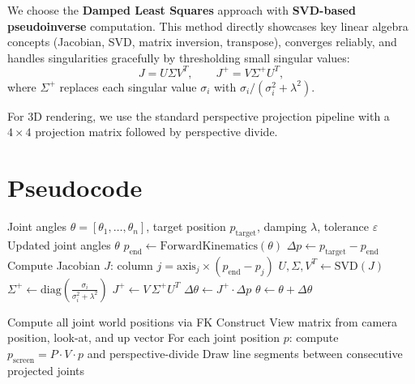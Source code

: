 \documentclass[11pt]{article}
\begin{document}
We choose the \textbf{Damped Least Squares} approach with \textbf{SVD-based pseudoinverse} computation. This method directly showcases key linear algebra concepts (Jacobian, SVD, matrix inversion, transpose), converges reliably, and handles singularities gracefully by thresholding small singular values:
\[
J = U \Sigma V^T, \qquad J^+ = V \Sigma^+ U^T,
\]
where $\Sigma^+$ replaces each singular value $\sigma_i$ with $\sigma_i / (\sigma_i^2 + \lambda^2)$.

For 3D rendering, we use the standard perspective projection pipeline with a $4\times 4$ projection matrix followed by perspective divide.

\section{Pseudocode}

\begin{algorithm}[H]
\caption{Inverse Kinematics via Damped Least Squares}
\begin{algorithmic}[1]
\Require Joint angles $\theta = [\theta_1, \dots, \theta_n]$, target position $p_{\text{target}}$, damping $\lambda$, tolerance $\varepsilon$
\Ensure Updated joint angles $\theta$
    \State $p_{\text{end}} \gets \text{ForwardKinematics}(\theta)$ 
    \State $\Delta p \gets p_{\text{target}} - p_{\text{end}}$
    \State Compute Jacobian $J$: column $j = \text{axis}_j \times (p_{\text{end}} - p_j)$
    \State $U, \Sigma, V^T \gets \text{SVD}(J)$ 
    \State $\Sigma^+ \gets \text{diag}\!\left(\frac{\sigma_i}{\sigma_i^2 + \lambda^2}\right)$ 
    \State $J^+ \gets V \, \Sigma^+ U^T$
    \State $\Delta\theta \gets J^+ \cdot \Delta p$
    \State $\theta \gets \theta + \Delta\theta$
\EndWhile
\end{algorithmic}
\end{algorithm}

\begin{algorithm}[H]
\caption{Rendering Pipeline (per frame)}
\begin{algorithmic}[1]
\State Compute all joint world positions via FK
\State Construct View matrix from camera position, look-at, and up vector
\State For each joint position $p$: compute $p_{\text{screen}} = P \cdot V \cdot p$ and perspective-divide
\State Draw line segments between consecutive projected joints
\end{algorithmic}
\end{algorithm}
\end{document}
